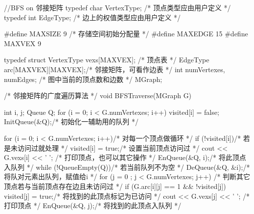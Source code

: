 \begin{Codex}
    //BFS on 邻接矩阵
    typedef char VertexType; /* 顶点类型应由用户定义 */
    typedef int EdgeType; /* 边上的权值类型应由用户定义 */

    #define MAXSIZE 9 /* 存储空间初始分配量 */
    #define MAXEDGE 15
    #define MAXVEX 9

    typedef struct{
        VertexType vexs[MAXVEX]; /* 顶点表 */
        EdgeType arc[MAXVEX][MAXVEX];/* 邻接矩阵，可看作边表 */
        int numVertexes, numEdges; /* 图中当前的顶点数和边数 */
    } MGraph;

    /* 邻接矩阵的广度遍历算法 */
    void BFSTraverse(MGraph G){
        int i, j;
        Queue Q;
        for (i = 0; i < G.numVertexes; i++)
            visited[i] = false;
        InitQueue(&Q);/* 初始化一辅助用的队列 */

        for (i = 0; i < G.numVertexes; i++){/* 对每一个顶点做循环 */
            if (!visited[i]){/* 若是未访问过就处理 */
                visited[i] = true;/* 设置当前顶点访问过 */
                cout << G.vexs[i] << ' '; /* 打印顶点，也可以其它操作 */
                EnQueue(&Q, i);/* 将此顶点入队列 */
                while (!QueueEmpty(Q)){/* 若当前队列不为空 */
                    DeQueue(&Q, &i);/* 将队对元素出队列，赋值给i */
                    for (j = 0 ; j < G.numVertexes; j++){
                        /* 判断其它顶点若与当前顶点存在边且未访问过  */
                        if (G.arc[i][j] == 1 && !visited[j]){
                            visited[j] = true;/* 将找到的此顶点标记为已访问 */
                            cout << G.vexs[j] << ' '; /* 打印顶点 */
                            EnQueue(&Q, j);/* 将找到的此顶点入队列  */
                        }
                    }
                }
            }
        }
    }
\end{Codex}

